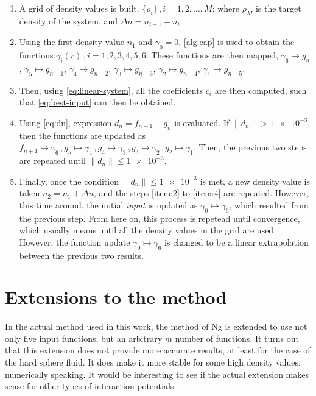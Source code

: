 \begin{enumerate}
    \item \label{item:1} A grid of density values is built, \(\{\rho_i\} \, , i=1,2,\dots,M\); where \(\rho_{M}\) is the target density of the system, and \(\Delta n = n_{i+1} - n_{i}\).
    \item \label{item:2} Using the first density value \(n_1\) and \(\gamma_0 = 0\), \autoref{alg:cap} is used to obtain the functions \(\gamma_i (r) \, , i=1,2,3,4,5,6\). These functions are then mapped, \(\gamma_6 \mapsto g_n\), \(\gamma_5 \mapsto g_{n-1}\), \(\gamma_4 \mapsto g_{n-2}\), \(\gamma_3 \mapsto g_{n-3}\), \(\gamma_2 \mapsto g_{n-4}\), \(\gamma_1 \mapsto g_{n-5}\).
    \item \label{item:3} Then, using \autoref{eq:linear-system}, all the coefficients \(c_i\) are then computed, such that \autoref{eq:best-input} can then be obtained.
    \item \label{item:4} Using \autoref{eq:dn}, expression \(d_n = f_{n+1} - g_n\) is evaluated. If \(\lVert d_n \rVert > \num{1e-3}\), then the functions are updated as \(f_{n+1} \mapsto \gamma_6 \, , g_5 \mapsto \gamma_4 \, , g_4 \mapsto \gamma_3 \, , g_3 \mapsto \gamma_2 \, , g_2 \mapsto \gamma_1\). Then, the previous two steps are repeated until \(\lVert d_n \rVert \leq \num{1e-3}\).
    \item \label{item:5} Finally, once the condition \(\lVert d_n \rVert \leq \num{1e-3}\) is met, a new density value is taken \(n_2 = n_1 + \Delta n\), and the steps \ref{item:2} to \ref{item:4} are repeated. However, this time around, the initial \emph{input} is updated as \(\gamma_{0} \mapsto \gamma_6\), which resulted from the previous step. From here on, this process is repetead until convergence, which usually means until all the density values in the grid are used. However, the function update \(\gamma_{0} \mapsto \gamma_6\) is changed to be a linear extrapolation between the previous two results.
\end{enumerate}

\section{Extensions to the method}
In the actual method used in this work, the method of Ng is extended to use not only five 
input functions, but an arbitrary \(m\) number of functions. It turns out that 
this extension does not provide more accurate results, at least for the case of the hard 
sphere fluid. It does make it more stable for some high density values, numerically 
speaking. It would be interesting to see if the actual extension makes sense for other 
types of interaction potentials.

